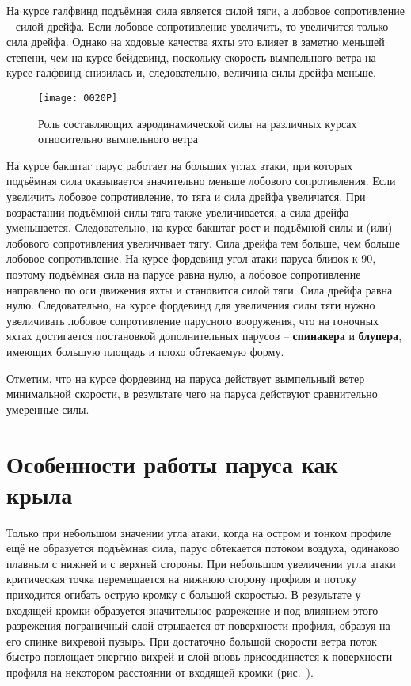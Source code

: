 На курсе галфвинд подъёмная сила является силой тяги, а лобовое
сопротивление \--- силой дрейфа. Если лобовое сопротивление увеличить,
то увеличится только сила дрейфа. Однако на ходовые качества яхты это
влияет в заметно меньшей степени, чем на курсе бейдевинд, поскольку
скорость вымпельного ветра на курсе галфвинд снизилась и,
следовательно, величина силы дрейфа меньше.

\begin{figure*}[!htb]
  \centering
  \texttt{[image: 0020P]}
  \caption{Роль составляющих аэродинамической силы на различных курсах относительно вымпельного ветра}
  \label{fig:20}
\end{figure*}

На курсе бакштаг парус работает на больших углах атаки, при которых
подъёмная сила оказывается значительно меньше лобового
сопротивления. Если увеличить лобовое сопротивление, то тяга и сила
дрейфа увеличатся. При возрастании подъёмной силы тяга также
увеличивается, а сила дрейфа уменьшается. Следовательно, на курсе
бакштаг рост и подъёмной силы и (или) лобового сопротивления
увеличивает тягу. Сила дрейфа тем больше, чем больше лобовое
сопротивление. На курсе фордевинд угол атаки паруса близок к 90\gr,
поэтому подъёмная сила на парусе равна нулю, а лобовое сопротивление
направлено по оси движения яхты и становится силой тяги. Сила дрейфа
равна нулю. Следовательно, на курсе фордевинд для увеличения силы тяги
нужно увеличивать лобовое сопротивление парусного вооружения, что на
гоночных яхтах достигается постановкой дополнительных парусов \---
\textbf{спинакера} и \textbf{блупера}, имеющих большую площадь и плохо
обтекаемую форму.

Отметим, что на курсе фордевинд на паруса действует вымпельный ветер
минимальной скорости, в результате чего на паруса действуют
сравнительно умеренные силы.

\section{Особенности работы паруса как крыла}

Только при небольшом значении угла атаки, когда на остром и тонком
профиле ещё не образуется подъёмная сила, парус обтекается потоком
воздуха, одинаково плавным с нижней и с верхней стороны. При небольшом
увеличении угла атаки критическая точка перемещается на нижнюю сторону
профиля и потоку приходится огибать острую кромку с большой
скоростью. В результате у входящей кромки образуется значительное
разрежение и под влиянием этого разрежения пограничный слой отрывается
от поверхности профиля, образуя на его спинке вихревой пузырь. При
достаточно большой скорости ветра поток быстро поглощает энергию
вихрей и слой вновь присоединяется к поверхности профиля на некотором
расстоянии от входящей кромки (рис.~).

